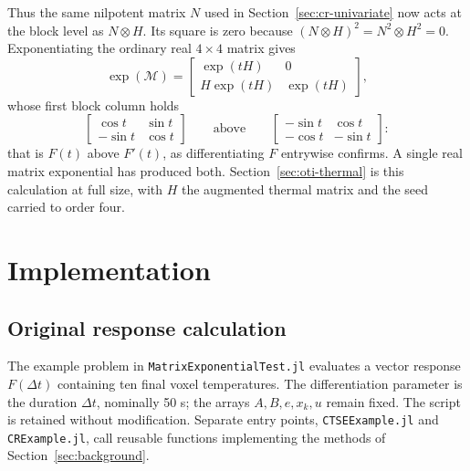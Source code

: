 \documentclass[10pt]{article}
\begin{document}
Thus the same nilpotent matrix $N$ used in Section~\ref{sec:cr-univariate}
now acts at the block level as $N\otimes H$. Its square is zero because
$(N\otimes H)^2=N^2\otimes H^2=0$. Exponentiating the
ordinary real $4\times4$ matrix gives
\[
 \exp(\mathcal M)
 =\begin{bmatrix}\exp(tH)&0\\ H\exp(tH)&\exp(tH)\end{bmatrix},
\]
whose first block column holds
\[
 \begin{bmatrix}\cos t&\sin t\\-\sin t&\cos t\end{bmatrix}
 \qquad\text{above}\qquad
 \begin{bmatrix}-\sin t&\cos t\\-\cos t&-\sin t\end{bmatrix}:
\]
that is $F(t)$ above $F'(t)$, as differentiating $F$ entrywise confirms. A
single real matrix exponential has produced both.
Section~\ref{sec:oti-thermal} is this calculation at full size, with $H$ the
augmented thermal matrix and the seed carried to order four.

\clearpage
\section{Implementation}
\label{sec:implementation}
\subsection{Original response calculation}
\label{sec:baseline}
The example problem in \texttt{MatrixExponentialTest.jl} evaluates a vector
response $F(\Delta t)$ containing ten final voxel temperatures. The
differentiation parameter is the duration $\Delta t$, nominally 50 s; the
arrays $A,B,e,x_k,u$ remain fixed. The script is retained without modification. Separate
entry points, \texttt{CTSEExample.jl} and \texttt{CRExample.jl}, call reusable
functions implementing the methods of Section~\ref{sec:background}.
\end{document}
